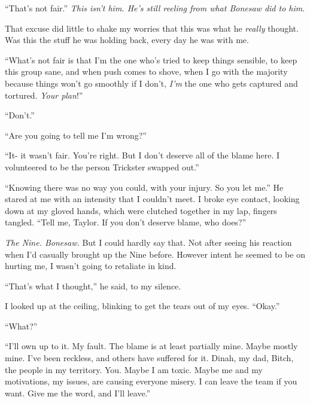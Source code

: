 ``That's not fair.''  \emph{This isn't him.  He's still reeling from what Bonesaw did to him}.



That excuse did little to shake my worries that this was what he \emph{really} thought.  Was this the stuff he was holding back, every day he was with me.



``What's not fair is that I'm the one who's tried to keep things sensible, to keep this group sane, and when push comes to shove, when I go with the majority because things won't go smoothly if I don't, \emph{I'm} the one who gets captured and tortured.  \emph{Your plan}!''



``Don't.''



``Are you going to tell me I'm wrong?''



``It- it wasn't fair.  You're right.  But I don't deserve all of the blame here.  I volunteered to be the person Trickster swapped out.''



``Knowing there was no way you could, with your injury.  So you let me.''  He stared at me with an intensity that I couldn't meet.  I broke eye contact, looking down at my gloved hands, which were clutched together in my lap, fingers tangled.  ``Tell me, Taylor.  If you don't deserve blame, who does?''



\emph{The Nine. Bonesaw.}  But I could hardly say that.  Not after seeing his reaction when I'd casually brought up the Nine before.  However intent he seemed to be on hurting me, I wasn't going to retaliate in kind.



``That's what I thought,'' he said, to my silence.



I looked up at the ceiling, blinking to get the tears out of my eyes.  ``Okay.''



``What?''



``I'll own up to it.  My fault.  The blame is at least partially mine.  Maybe mostly mine.  I've been reckless, and others have suffered for it.  Dinah, my dad, Bitch, the people in my territory.  You.  Maybe I am toxic.  Maybe me and my motivations, my issues, are causing everyone misery.  I can leave the team if you want.  Give me the word, and I'll leave.''




